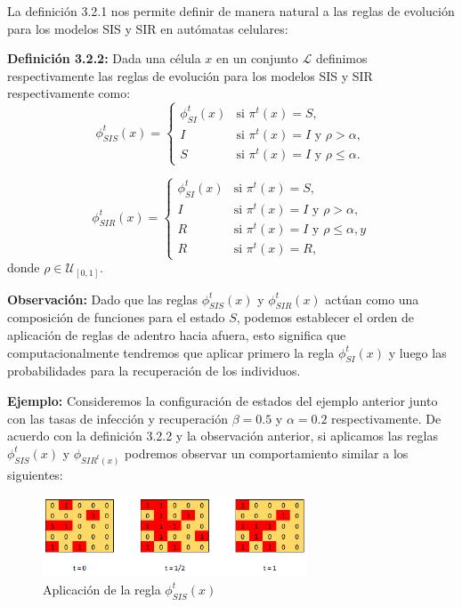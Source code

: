 La definición 3.2.1 nos permite definir de manera natural a las reglas de evolución para los modelos SIS y SIR en autómatas celulares:

\textbf{Definición 3.2.2:} Dada una célula $x$ en un conjunto $\mathcal{L}$ definimos respectivamente las reglas de evolución para los modelos SIS y SIR respectivamente como:
\begin{equation}
    \phi_{SIS}^t(x)=\left\{\begin{array}{ll}
        \phi_{SI}^t(x) & \text{si }\pi^t(x) = S,\\
        I & \text{si }\pi^t(x)=I\text{ y }\rho>\alpha,\\
        S & \text{si }\pi^t(x)=I\text{ y }\rho\leq\alpha.
    \end{array}\right.
\end{equation}

\begin{equation}
    \phi_{SIR}^t(x)=\left\{\begin{array}{ll}
        \phi_{SI}^t(x) & \text{si }\pi^t(x) = S,\\
        I & \text{si }\pi^t(x)=I\text{ y }\rho>\alpha,\\
        R & \text{si }\pi^t(x)=I\text{ y }\rho\leq\alpha, y \\
        R & \text{si }\pi^t(x)=R,
    \end{array}\right.
\end{equation}
donde $\rho\in\mathcal{U}_{[0,1]}$.

\textbf{Observación:} Dado que las reglas $\phi_{SIS}^t(x)$ y $\phi_{SIR}^t(x)$ actúan como una composición de funciones para el estado $S$, podemos establecer el orden de aplicación de reglas de adentro hacia afuera, esto significa que computacionalmente tendremos que aplicar primero la regla $\phi_{SI}^t(x)$ y luego las probabilidades para la recuperación de los individuos.

\textbf{Ejemplo:} Consideremos la configuración de estados del ejemplo anterior junto con las tasas de infección y recuperación $\beta=0.5$ y $\alpha=0.2$ respectivamente. De acuerdo con la definición 3.2.2 y la observación anterior, si aplicamos las reglas $\phi_{SIS}^t(x)$ y $\phi_{SIR^t(x)}$ podremos observar un comportamiento similar a los siguientes:

\begin{figure}[h]
  \centering
    \includegraphics[width=0.7\textwidth]{Imagenes/sisAplication.PNG}
    \caption{Aplicación de la regla $\phi_{SIS}^t(x)$}
\end{figure}

